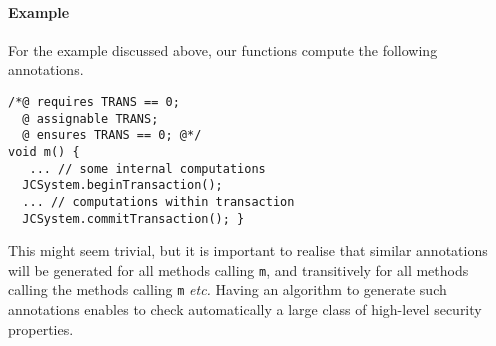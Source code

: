 \paragraph{Example}
For the example discussed above, our functions compute the following
annotations.

\begin{verbatim}
/*@ requires TRANS == 0;
  @ assignable TRANS;
  @ ensures TRANS == 0; @*/
void m() { 
   ... // some internal computations
  JCSystem.beginTransaction();
  ... // computations within transaction
  JCSystem.commitTransaction(); }
\end{verbatim}
This might seem trivial, but it is important to realise that similar
annotations will be generated for all methods calling
\texttt{m}, and transitively for all methods calling the methods
calling \texttt{m} \emph{etc.}
Having an algorithm to generate such annotations enables to check
automatically a large class of high-level security properties.

